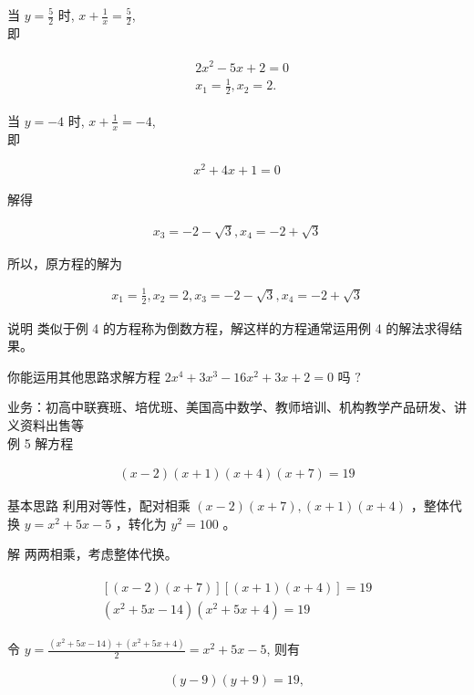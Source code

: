 \documentclass[10pt]{article}
\begin{document}
当 $y=\frac{5}{2}$ 时, $x+\frac{1}{x}=\frac{5}{2}$,\\
即

\begin{align*}
\begin{aligned}
& 2 x^{2}-5 x+2=0 \\
& x_{1}=\frac{1}{2}, x_{2}=2 .
\end{aligned}
\end{align*}

当 $y=-4$ 时, $x+\frac{1}{x}=-4$,\\
即

\begin{align*}
x^{2}+4 x+1=0
\end{align*}

解得

\begin{align*}
x_{3}=-2-\sqrt{3}, x_{4}=-2+\sqrt{3}
\end{align*}

所以，原方程的解为

\begin{align*}
x_{1}=\frac{1}{2}, x_{2}=2, x_{3}=-2-\sqrt{3}, x_{4}=-2+\sqrt{3}
\end{align*}

说明 类似于例 4 的方程称为倒数方程，解这样的方程通常运用例 4 的解法求得结果。

你能运用其他思路求解方程 $2 x^{4}+3 x^{3}-16 x^{2}+3 x+2=0$ 吗 $?$

业务：初高中联赛班、培优班、美国高中数学、教师培训、机构教学产品研发、讲义资料出售等\\
例 5 解方程

\begin{align*}
(x-2)(x+1)(x+4)(x+7)=19
\end{align*}

基本思路 利用对等性，配对相乘 $(x-2)(x+7),(x+1)(x+4)$ ，整体代换 $y=x^{2}+5 x-5$ ，转化为 $y^{2}=100$ 。

解 两两相乘，考虑整体代换。

\begin{align*}
\begin{gathered}
{[(x-2)(x+7)][(x+1)(x+4)]=19} \\
\left(x^{2}+5 x-14\right)\left(x^{2}+5 x+4\right)=19
\end{gathered}
\end{align*}

令 $y=\frac{\left(x^{2}+5 x-14\right)+\left(x^{2}+5 x+4\right)}{2}=x^{2}+5 x-5$, 则有

\begin{align*}
(y-9)(y+9)=19,
\end{align*}
\end{document}
